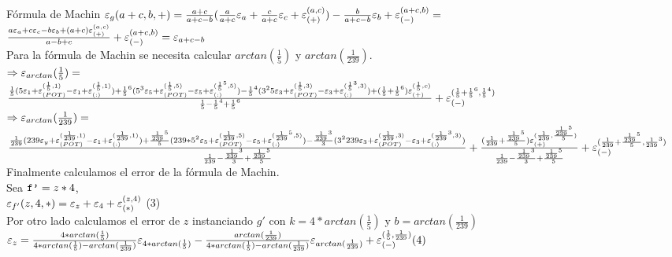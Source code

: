 \begin{section}{Fórmula de Machin}
	$\varepsilon _{g}({a+c,b,+}) = \frac{a+c}{a+c-b}(\frac{a}{a+c}\varepsilon _{a} + \frac{c}{a+c}\varepsilon _{c} + \varepsilon _{({+})}^{({a,c})}) - \frac{b}{a+c-b}\varepsilon _{b} + \varepsilon _{({-})}^{({a+c,b})} =$\\
	
	$\frac{a\varepsilon _{a} + c\varepsilon _{c} - b\varepsilon _{b} + (a+c)\varepsilon _{({+})}^{({a,c})}}{a-b+c} + \varepsilon _{({-})}^{({a+c,b})} = \varepsilon _{a+c-b}$\\
	
	Para la fórmula de Machin se necesita calcular $arctan(\frac{1}{5})$ y $arctan(\frac{1}{239})$.\\
	
	$\Rightarrow \varepsilon _{arctan}({\frac{1}{5}}) =$\\
	$\frac{\frac{1}{5}(5\varepsilon _{1} + \varepsilon _{({POT})}^{({\frac{1}{5},1})} - \varepsilon _{1} + \varepsilon _{({:})}^{({\frac{1}{5},1})}) + \frac{1}{5}^6(5^3\varepsilon _{5} + \varepsilon _{({POT})}^{({\frac{1}{5},5})} - \varepsilon _{5} + \varepsilon _{({:})}^{({\frac{1}{5}^5,5})}) - \frac{1}{5}^4(3^25\varepsilon _{3} + \varepsilon _{({POT})}^{({\frac{1}{5},3})} - \varepsilon _{3} + \varepsilon _{({:})}^{({\frac{1}{5}^3,3})}) + (\frac{1}{5}+\frac{1}{5}^6)\varepsilon _{({+})}^{({\frac{1}{5},c})}}{\frac{1}{5}-\frac{1}{5}^4+\frac{1}{5}^6} + \varepsilon _{({-})}^{({\frac{1}{5}+\frac{1}{5}^6,\frac{1}{5}^4})}$\\

	$\Rightarrow \varepsilon _{arctan}({\frac{1}{239}}) =$\\
	$\frac{\frac{1}{239}(239\varepsilon _{y} + \varepsilon _{({POT})}^{({\frac{1}{239},1})} - \varepsilon _{1} + \varepsilon _{({:})}^{({\frac{1}{239},1})}) + \frac{\frac{1}{239}^5}{5}(239*5^2\varepsilon _{5} + \varepsilon _{({POT})}^{({\frac{1}{239},5})} - \varepsilon _{5} + \varepsilon _{({:})}^{({\frac{1}{239}^5,5})}) - \frac{\frac{1}{239}^3}{3}(3^2239\varepsilon _{3} + \varepsilon _{({POT})}^{({\frac{1}{239},3})} - \varepsilon _{3} + \varepsilon _{({:})}^{({\frac{1}{239}^3,3})})}{\frac{1}{239}-\frac{\frac{1}{239}^3}{3}+\frac{\frac{1}{239}^5}{5}}  + \frac{(\frac{1}{239}+\frac{\frac{1}{239}^5}{5})\varepsilon _{({+})}^{({\frac{1}{239},\frac{\frac{1}{239}^5}{5}})}}{\frac{1}{239}-\frac{\frac{1}{239}^3}{3}+\frac{\frac{1}{239}^5}{5}} + \varepsilon _{({-})}^{({\frac{1}{239}+\frac{\frac{1}{239}^5}{5},\frac{1}{239}^3})}$\\
	
	Finalmente calculamos el error de la fórmula de Machin.\\
	
	Sea $\texttt{f'}=z*4$,\\
	
	$\varepsilon _{f'}({z,4,*}) = \varepsilon _{z} + \varepsilon _{4} + \varepsilon _{({*})}^{({z,4})}$ (3)\\
	
	Por otro lado calculamos el error de $z$ instanciando $g'$ con $k=4*arctan(\frac{1}{5})$ y $b=arctan(\frac{1}{239})$\\
	
	$\varepsilon _{z} = \frac{4*arctan(\frac{1}{5})}{4*arctan(\frac{1}{5})-arctan(\frac{1}{239})}\varepsilon _{4*arctan(\frac{1}{5})} - \frac{arctan(\frac{1}{239})}{4*arctan(\frac{1}{5})-arctan(\frac{1}{239})}\varepsilon _{arctan(\frac{1}{239})} + \varepsilon _{({-})}^{({\frac{1}{5},\frac{1}{239}})} (4)$
	

\end{section}
